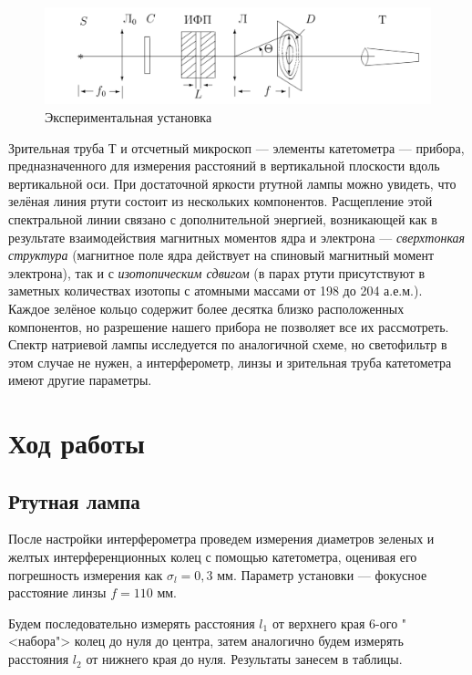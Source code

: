 \documentclass[12pt]{kiarticle} %
\begin{document}
		\begin{figure}[h!]
		\centering
		\includegraphics[width=\linewidth]{lab.png}
		\caption{Экспериментальная установка}
		\label{lab}
	\end{figure}

	
	Зрительная труба $ Т $ и отсчетный микроскоп  --- элементы катетометра --- прибора, предназначенного для измерения расстояний в вертикальной плоскости вдоль вертикальной оси. 
	При достаточной яркости ртутной лампы можно увидеть, что зелёная линия
	ртути состоит из нескольких компонентов. Расщепление этой спектральной линии связано с дополнительной энергией, возникающей как в результате взаимодействия магнитных моментов ядра и электрона --- \textit{сверхтонкая структура} (магнитное поле ядра действует на спиновый магнитный момент электрона), так и с \textit{изотопическим сдвигом} (в парах ртути присутствуют в заметных количествах изотопы с атомными массами от 198 до 204 а.е.м.). Каждое зелёное кольцо содержит более десятка близко расположенных компонентов, но разрешение нашего прибора не позволяет все их рассмотреть.
	Спектр натриевой лампы исследуется по аналогичной схеме, но светофильтр в этом случае не нужен, а интерферометр, линзы и зрительная труба катетометра
	имеют другие параметры.
	
		\section{Ход работы}
		
		\subsection{Ртутная лампа}
		
		После настройки интерферометра проведем измерения диаметров зеленых и желтых интерференционных колец с помощью катетометра, оценивая его погрешность измерения как $ \sigma_l = 0,3 $ мм. Параметр установки --- фокусное расстояние линзы $ f = 110 $ мм.
		
		Будем последовательно измерять расстояния $ l_1 $ от верхнего края 6-ого "<набора"> колец до нуля до центра, затем аналогично будем измерять расстояния $ l_2 $ от нижнего края до нуля. Результаты занесем в таблицы. 
		
\end{document}
